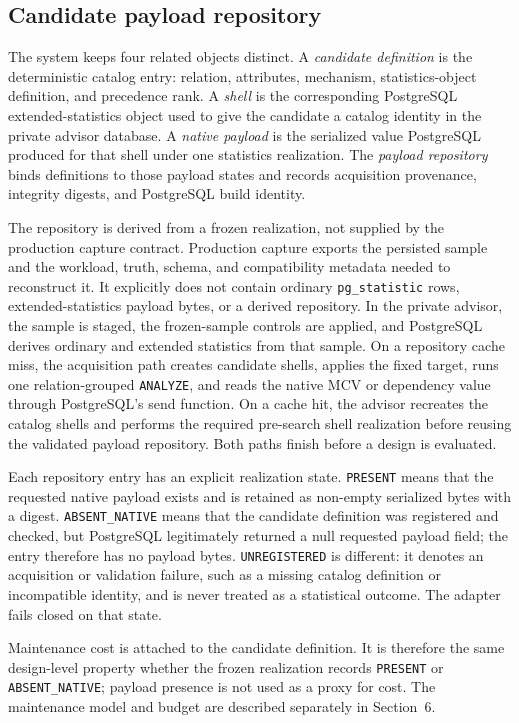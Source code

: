 \subsection{Candidate payload repository}

The system keeps four related objects distinct.  A \emph{candidate
definition} is the deterministic catalog entry: relation, attributes,
mechanism, statistics-object definition, and precedence rank.  A \emph{shell}
is the corresponding PostgreSQL extended-statistics object used to give the
candidate a catalog identity in the private advisor database.  A \emph{native
payload} is the serialized value PostgreSQL produced for that shell under one
statistics realization.  The \emph{payload repository} binds definitions to
those payload states and records acquisition provenance, integrity digests,
and PostgreSQL build identity.

The repository is derived from a frozen realization, not supplied by the
production capture contract.  Production capture exports the persisted sample
and the workload, truth, schema, and compatibility metadata needed to
reconstruct it.  It explicitly does not contain ordinary \texttt{pg\_statistic}
rows, extended-statistics payload bytes, or a derived repository.  In the
private advisor, the sample is staged, the frozen-sample controls are applied,
and PostgreSQL derives ordinary and extended statistics from that sample.  On
a repository cache miss, the acquisition path creates candidate shells,
applies the fixed target, runs one relation-grouped \texttt{ANALYZE}, and
reads the native MCV or dependency value through PostgreSQL's send function.
On a cache hit, the advisor recreates the catalog shells and performs the
required pre-search shell realization before reusing the validated payload
repository.  Both paths finish before a design is evaluated.

Each repository entry has an explicit realization state.  \texttt{PRESENT}
means that the requested native payload exists and is retained as non-empty
serialized bytes with a digest.  \texttt{ABSENT\_NATIVE} means that the
candidate definition was registered and checked, but PostgreSQL legitimately
returned a null requested payload field; the entry therefore has no payload
bytes.  \texttt{UNREGISTERED} is different: it denotes an acquisition or
validation failure, such as a missing catalog definition or incompatible
identity, and is never treated as a statistical outcome.  The adapter fails
closed on that state.

Maintenance cost is attached to the candidate definition.  It is therefore
the same design-level property whether the frozen realization records
\texttt{PRESENT} or \texttt{ABSENT\_NATIVE}; payload presence is not used as a
proxy for cost.  The maintenance model and budget are described separately in
Section~6.

